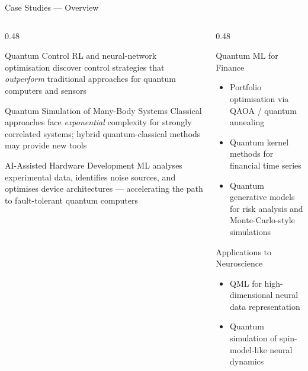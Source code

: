 \documentclass[aspectratio=169]{beamer}
\begin{document}
\begin{frame}{Case Studies — Overview}

  \begin{columns}[T]
    \begin{column}{0.48\textwidth}
      \begin{block}{Quantum Control}
        RL and neural-network optimisation discover control strategies
        that \emph{outperform} traditional approaches for quantum
        computers and sensors
      \end{block}
      \medskip
      \begin{block}{Quantum Simulation of Many-Body Systems}
        Classical approaches face \emph{exponential} complexity for
        strongly correlated systems; hybrid quantum-classical methods
        may provide new tools
      \end{block}
      \medskip
      \begin{block}{AI-Assisted Hardware Development}
        ML analyses experimental data, identifies noise sources, and
        optimises device architectures — accelerating the path to
        fault-tolerant quantum computers
      \end{block}
    \end{column}
    \begin{column}{0.48\textwidth}
      \begin{block}{Quantum ML for Finance}
        \begin{itemize}
          \item Portfolio optimisation via QAOA / quantum annealing
          \item Quantum kernel methods for financial time series
          \item Quantum generative models for risk analysis and
                Monte-Carlo-style simulations
        \end{itemize}
      \end{block}
      \medskip
      \begin{block}{Applications to Neuroscience}
        \begin{itemize}
          \item QML for high-dimensional neural data representation
          \item Quantum simulation of spin-model-like neural dynamics
        \end{itemize}
      \end{block}
    \end{column}
  \end{columns}

\end{frame}
\end{document}
